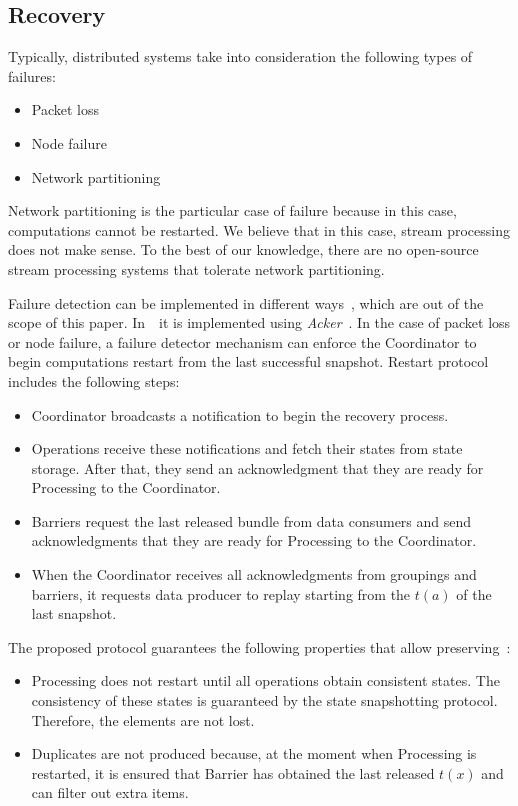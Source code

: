 \subsection{Recovery}

Typically, distributed systems take into consideration the following types of failures:
\begin{itemize}
    \item Packet loss
    \item Node failure
    \item Network partitioning
\end{itemize}

Network partitioning is the particular case of failure because in this case, computations cannot be restarted. We believe that in this case, stream processing does not make sense. To the best of our knowledge, there are no open-source stream processing systems that tolerate network partitioning.

Failure detection can be implemented in different ways~\cite{hayashibara2002failure}, which are out of the scope of this paper. In~\FlameStream\ it is implemented using {\em Acker}~\cite{we2018adbis}. In the case of packet loss or node failure, a failure detector mechanism can enforce the Coordinator to begin computations restart from the last successful snapshot. Restart protocol includes the following steps:

\begin{itemize}
    \item Coordinator broadcasts a notification to begin the recovery process.
    \item Operations receive these notifications and fetch their states from state storage. After that, they send an acknowledgment that they are ready for Processing to the Coordinator.
    \item Barriers request the last released bundle from data consumers and send acknowledgments that they are ready for Processing to the Coordinator.
    \item When the Coordinator receives all acknowledgments from groupings and barriers, it requests data producer to replay starting from the $t(a)$ of the last snapshot.
\end{itemize}

The proposed protocol guarantees the following properties that allow preserving~\eo:

\begin{itemize}
    \item Processing does not restart until all operations obtain consistent states. The consistency of these states is guaranteed by the state snapshotting protocol. Therefore, the elements are not lost.
    \item Duplicates are not produced because, at the moment when Processing is restarted, it is ensured that Barrier has obtained the last released $t(x)$ and can filter out extra items.
\end{itemize}